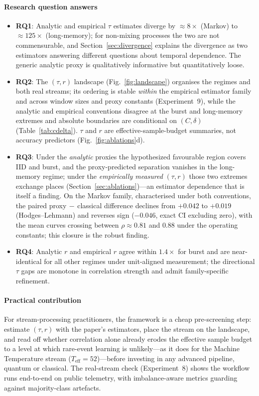 \documentclass[sensors,article,submit,pdftex,moreauthors]{Definitions/mdpi}
\newcommand{\Teff}{T_{\mathrm{eff}}}
\begin{document}
\paragraph{Research question answers}
\begin{itemize}
    \item \textbf{RQ1}: Analytic and empirical $\tau$ estimates diverge by $\approx 8\times$ (Markov) to $\approx 125\times$ (long-memory); for non-mixing processes the two are not commensurable, and Section~\ref{sec:divergence} explains the divergence as two estimators answering different questions about temporal dependence. The generic analytic proxy is qualitatively informative but quantitatively loose.
    \item \textbf{RQ2}: The $(\tau, r)$ landscape (Fig.~\ref{fig:landscape}) organises the regimes and both real streams; its ordering is stable \emph{within} the empirical estimator family and across window sizes and proxy constants (Experiment~9), while the analytic and empirical conventions disagree at the burst and long-memory extremes and absolute boundaries are conditional on $(C, \delta)$ (Table~\ref{tab:cdelta}). $\tau$ and $r$ are effective-sample-budget summaries, not accuracy predictors (Fig.~\ref{fig:ablations}d).
    \item \textbf{RQ3}: Under the \emph{analytic} proxies the hypothesized favourable region covers IID and burst, and the proxy-predicted separation vanishes in the long-memory regime; under the \emph{empirically measured} $(\tau, r)$ those two extremes exchange places (Section~\ref{sec:ablations})---an estimator dependence that is itself a finding. On the Markov family, characterised under both conventions, the paired proxy$\,-\,$classical difference declines from $+0.042$ to $+0.019$ (Hodges--Lehmann) and reverses sign ($-0.046$, exact CI excluding zero), with the mean curves crossing between $\rho \approx 0.81$ and $0.88$ under the operating constants; this closure is the robust finding.
    \item \textbf{RQ4}: Analytic $r$ and empirical $r$ agree within $1.4\times$ for burst and are near-identical for all other regimes under unit-aligned measurement; the directional $\tau$ gaps are monotone in correlation strength and admit family-specific refinement.
\end{itemize}

\paragraph{Practical contribution} For stream-processing practitioners, the framework is a cheap pre-screening step: estimate $(\tau, r)$ with the paper's estimators, place the stream on the landscape, and read off whether correlation alone already erodes the effective sample budget to a level at which rare-event learning is unlikely---as it does for the Machine Temperature stream ($\Teff = 52$)---before investing in any advanced pipeline, quantum or classical. The real-stream check (Experiment~8) shows the workflow runs end-to-end on public telemetry, with imbalance-aware metrics guarding against majority-class artefacts.
\end{document}
